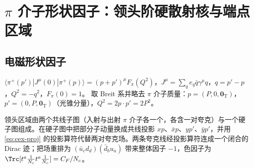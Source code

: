 \section{\texorpdfstring{$\pi$}{pi} 介子形状因子：领头阶硬散射核与端点区域}\label{sec:cex-ff}

\subsection{电磁形状因子}

\begin{definition}\label{def:cex-fpi}
$\langle\pi^+(p')|J^\mu(0)|\pi^+(p)\rangle=(p+p')^\mu F_\pi(Q^2)$，$J^\mu=\sum_qe_q\bar q\gamma^\mu q$，$q=p'-p$，$Q^2=-q^2$，$F_\pi(0)=1$。
取 Breit 系并略去 $\pi$ 介子质量：$p=(P,0,\bm 0_{\mathrm T})$，$p'=(0,P,\bm 0_{\mathrm T})$（光锥分量），$Q^2=2p\cdot p'=2P^2$。
\end{definition}

领头区域由两个共线子图（入射与出射 $\pi$ 介子各一个，各含一对夸克）与一个硬子图组成。在硬子图中把部分子动量换成共线投影
$xp$、$\bar xp$、$yp'$、$\bar yp'$，并用 \cref{eq:cex-proj} 的投影算符代替两对夸克场。两条夸克线经投影算符连成一个闭合的
Dirac 迹；把场重排为 $(\bar u_cd_d)(\bar d_bu_a)$ 带来整体因子 $-1$，色因子为 $\Trc[t^a\frac1{N_c}t^a\frac1{N_c}]=C_F/N_c$。

